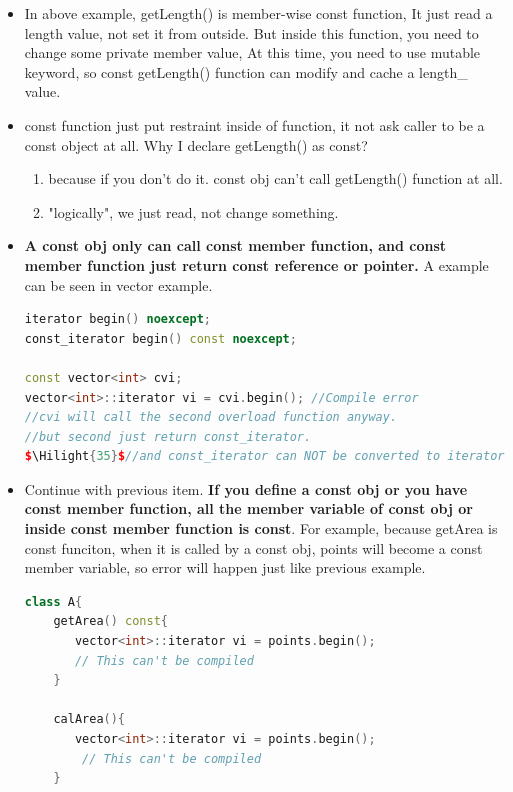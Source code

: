 \documentclass[a4paper,12pt,twoside]{book}
\newcommand{\Hilight}[1]{\makebox[0pt][l]{\color{yellow}\rule[-3pt]{#1em}{11pt}}}
\begin{document}
\begin{itemize}
\item In above example, getLength() is member-wise const function, It just read a length value, not set it from outside. But inside this function, you need to change some private member value, At this time, you need to use mutable keyword, so const getLength() function can modify and cache a length\_ value.

\item const function just put restraint inside of function, it not ask caller to be a const object at all. Why I declare getLength() as const?
\begin{enumerate}
	\item because if you don't do it. const obj can't call getLength() function at all. 
	\item "logically", we just read, not change something.
\end{enumerate}



\item \textbf{A const obj only can call const member function, and const member function just return const reference or pointer.} A example can be seen in vector example.  

\begin{lstlisting}[frame=single, language=c++]
iterator begin() noexcept;
const_iterator begin() const noexcept;

const vector<int> cvi;
vector<int>::iterator vi = cvi.begin(); //Compile error
//cvi will call the second overload function anyway.
//but second just return const_iterator. 
$\Hilight{35}$//and const_iterator can NOT be converted to iterator implicitly.
\end{lstlisting}

\item Continue with previous item.\textbf{ If you define a const obj or you have const member function, all the member variable of const obj or inside const member function is const}. For example, because getArea is const funciton, when it is called by a const obj, points will become a const member variable, so error will happen just like previous example. 

\begin{lstlisting}[frame=single, language=c++]
class A{
	getArea() const{
	   vector<int>::iterator vi = points.begin();
	   // This can't be compiled
	}

	calArea(){
	   vector<int>::iterator vi = points.begin();
	    // This can't be compiled
	}


\end{lstlisting}
\end{itemize}
\end{document}
